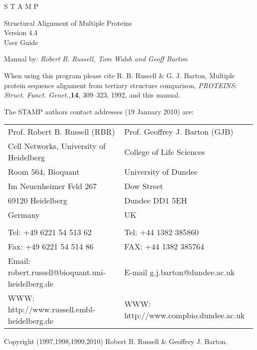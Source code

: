 \begin{titlepage}
    \begin{center}
        \begin{bf}
            \begin{Huge}
                S T A M P\\
            \end{Huge}
            \begin{Large}
                Structural Alignment of Multiple Proteins \\
                Version 4.4\\
                User Guide\\
            \end{Large}
        \end{bf}
        \vskip 0.25in

        Manual by: {\em Robert B. Russell, Tom Walsh and Geoff Barton}\\


    \end{center}
    \vskip 0.25in

    \noindent
    When using this program please cite R. B. Russell \& G. J.  Barton, 
    Multiple protein sequence alignment from tertiary structure 
    comparison, {\em PROTEINS: Struct. Funct. Genet.},{\bf 14}, 
    309--323, 1992, and this manual.\\

    \vskip 0.25in

    The STAMP authors contact addresses (19 January 2010) are:

    \vskip 0.1in

    \begin{tabular}{ll}
        Prof. Robert B. Russell (RBR)                    & Prof. Geoffrey J. Barton (GJB)\\
        Cell Networks, University of Heidelberg          & College of Life Sciences\\
        Room 564, Bioquant                               & University of Dundee\\
        Im Neuenheimer Feld 267                          & Dow Street\\
        69120 Heidelberg                                 & Dundee DD1 5EH\\
        Germany                                          & UK\\
        &  \\
        Tel: +49 6221 54 513 62                          & Tel: +44 1382 385860\\
        Fax: +49 6221 54 514 86                          & FAX: +44 1382 385764\\
        Email: robert.russell@bioquant.uni-heidelberg.de & E-mail g.j.barton@dundee.ac.uk\\
        WWW: http://www.russell.embl-heidelberg.de       & WWW: http://www.compbio.dundee.ac.uk\\
    \end{tabular}
    \vskip 0.25in
    \noindent
    \begin{center}
        Copyright (1997,1998,1999,2010) Robert B. Russell \& Geoffrey J. Barton.\\


\end{center}
\end{titlepage}

